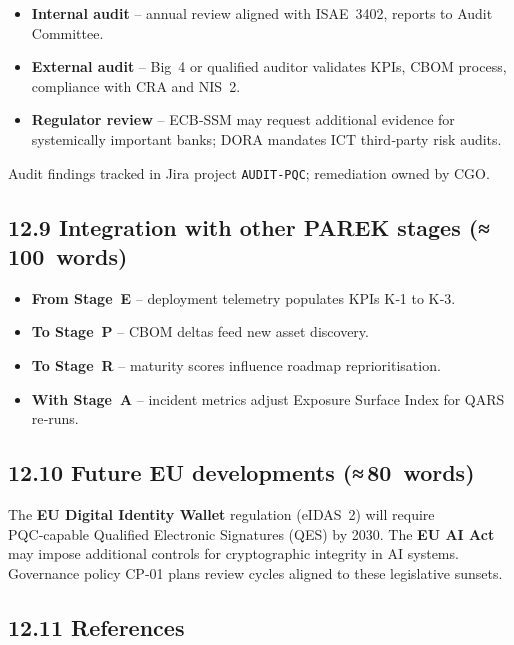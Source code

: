 \documentclass[
  english,
]{article}
\providecommand{\tightlist}{%
  \setlength{\itemsep}{0pt}\setlength{\parskip}{0pt}}
\begin{document}
\begin{itemize}
\tightlist
\item
  \textbf{Internal audit} -- annual review aligned with ISAE~3402,
  reports to Audit Committee.
\item
  \textbf{External audit} -- Big~4 or qualified auditor validates KPIs,
  CBOM process, compliance with CRA and NIS~2.
\item
  \textbf{Regulator review} -- ECB‑SSM may request additional evidence
  for systemically important banks; DORA mandates ICT third‑party risk
  audits.
\end{itemize}

Audit findings tracked in Jira project \texttt{AUDIT‑PQC}; remediation
owned by CGO.

\subsection{12.9 Integration with other PAREK stages
(≈\,100~words)}\label{integration-with-other-parek-stages-100-words}

\begin{itemize}
\tightlist
\item
  \textbf{From Stage~E} -- deployment telemetry populates KPIs K‑1 to
  K‑3.
\item
  \textbf{To Stage~P} -- CBOM deltas feed new asset discovery.
\item
  \textbf{To Stage~R} -- maturity scores influence roadmap
  reprioritisation.
\item
  \textbf{With Stage~A} -- incident metrics adjust Exposure Surface
  Index for QARS re‑runs.
\end{itemize}

\subsection{12.10 Future EU developments
(≈\,80~words)}\label{future-eu-developments-80-words}

The \textbf{EU Digital Identity Wallet} regulation (eIDAS~2) will
require PQC‑capable Qualified Electronic Signatures (QES) by 2030. The
\textbf{EU AI Act} may impose additional controls for cryptographic
integrity in AI systems. Governance policy CP‑01 plans review cycles
aligned to these legislative sunsets.

\subsection{12.11 References}\label{references-4}
\end{document}
